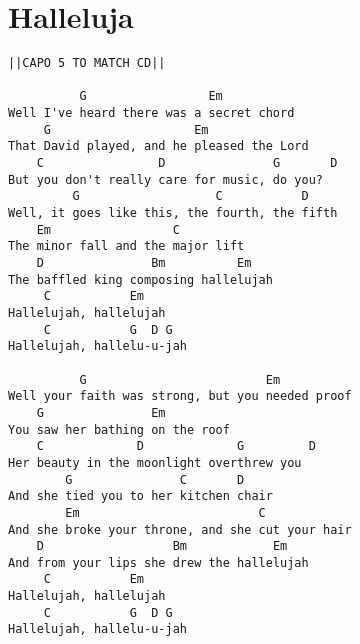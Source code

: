 \documentclass[leqno]{memoir}
\begin{document}
\chapter{Halleluja}
\begin{verbatim}
||CAPO 5 TO MATCH CD||

          G                 Em
Well I've heard there was a secret chord
     G                    Em
That David played, and he pleased the Lord 
    C                D               G       D
But you don't really care for music, do you? 
         G                   C           D
Well, it goes like this, the fourth, the fifth 
    Em                 C
The minor fall and the major lift 
    D               Bm          Em
The baffled king composing hallelujah 
     C           Em
Hallelujah, hallelujah
     C           G  D G
Hallelujah, hallelu-u-jah 

          G                         Em
Well your faith was strong, but you needed proof 
    G               Em
You saw her bathing on the roof 
    C             D             G         D
Her beauty in the moonlight overthrew you 
        G               C       D
And she tied you to her kitchen chair 
        Em                         C
And she broke your throne, and she cut your hair 
    D                  Bm            Em
And from your lips she drew the hallelujah 
     C           Em
Hallelujah, hallelujah
     C           G  D G
Hallelujah, hallelu-u-jah 
\end{verbatim}
\newpage
\end{document}
